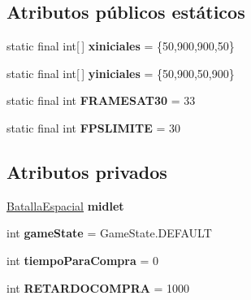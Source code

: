 \subsection*{Atributos públicos estáticos}
\begin{DoxyCompactItemize}
\item 
\hypertarget{classBatallaEspacial_1_1Juego_a7c2d4bf040a8a1287968cfbf697f4115}{
static final int\mbox{[}$\,$\mbox{]} {\bfseries xiniciales} = \{50,900,900,50\}}
\label{classBatallaEspacial_1_1Juego_a7c2d4bf040a8a1287968cfbf697f4115}

\item 
\hypertarget{classBatallaEspacial_1_1Juego_a2b17ba16671f2fe0ce010223a926a04b}{
static final int\mbox{[}$\,$\mbox{]} {\bfseries yiniciales} = \{50,900,50,900\}}
\label{classBatallaEspacial_1_1Juego_a2b17ba16671f2fe0ce010223a926a04b}

\item 
\hypertarget{classBatallaEspacial_1_1Juego_af23376bd0397d5524a9636000386b6ef}{
static final int {\bfseries FRAMESAT30} = 33}
\label{classBatallaEspacial_1_1Juego_af23376bd0397d5524a9636000386b6ef}

\item 
\hypertarget{classBatallaEspacial_1_1Juego_a87854cd06609c0127da626202eff4873}{
static final int {\bfseries FPSLIMITE} = 30}
\label{classBatallaEspacial_1_1Juego_a87854cd06609c0127da626202eff4873}

\end{DoxyCompactItemize}
\subsection*{Atributos privados}
\begin{DoxyCompactItemize}
\item 
\hypertarget{classBatallaEspacial_1_1Juego_a9472677eba5ef5c4f445413945ffc6ee}{
\hyperlink{classBatallaEspacial_1_1BatallaEspacial}{BatallaEspacial} {\bfseries midlet}}
\label{classBatallaEspacial_1_1Juego_a9472677eba5ef5c4f445413945ffc6ee}

\item 
\hypertarget{classBatallaEspacial_1_1Juego_a35456e547588c91168ae8ded67b0f5de}{
int {\bfseries gameState} = GameState.DEFAULT}
\label{classBatallaEspacial_1_1Juego_a35456e547588c91168ae8ded67b0f5de}

\item 
\hypertarget{classBatallaEspacial_1_1Juego_ab095346595193ceaee5b64def317dcd3}{
int {\bfseries tiempoParaCompra} = 0}
\label{classBatallaEspacial_1_1Juego_ab095346595193ceaee5b64def317dcd3}

\item 
\hypertarget{classBatallaEspacial_1_1Juego_a90ec77ffe29809f5baf5765ecf2f0af4}{
int {\bfseries RETARDOCOMPRA} = 1000}
\label{classBatallaEspacial_1_1Juego_a90ec77ffe29809f5baf5765ecf2f0af4}

\end{DoxyCompactItemize}
